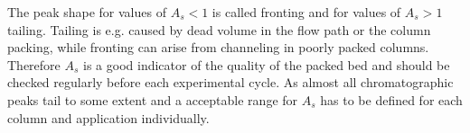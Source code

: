 The peak shape for values of $A_{s} < 1$ is called fronting and for values of $A_{s} > 1$ tailing. Tailing is e.g. caused by dead volume in the flow path or the column packing, while fronting can arise from channeling in poorly packed columns. Therefore $A_{s}$ is a good indicator of the quality of the packed bed and should be checked regularly before each experimental cycle. As almost all chromatographic peaks tail to some extent and a acceptable range for $A_{s}$ has to be defined for each column and application individually.  

% 
% 
% 
